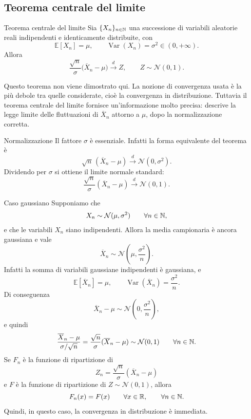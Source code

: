 \documentclass[a4paper]{article}
\begin{document}
\subsection{Teorema centrale del limite}

\begin{snippettheorem}{Teorema centrale del limite}
    Sia \(\{X_n\}_{n\in\mathbb{N}}\) una successione di variabili aleatorie reali indipendenti e identicamente distribuite, con
    \[
        \mathbb{E}[X_n]=\mu,
        \qquad
        \operatorname{Var}(X_n)=\sigma^2\in(0,+\infty).
    \]
    Allora
    \[
        \frac{\sqrt n}{\sigma}\bigl(\overline{X}_n-\mu\bigr)
        \xrightarrow{d}
        Z,
        \qquad
        Z\sim\mathcal{N}(0,1).
    \]
\end{snippettheorem}

Questo teorema non viene dimostrato qui. La nozione di convergenza usata è la più debole tra quelle considerate, cioè la convergenza in distribuzione. Tuttavia il teorema centrale del limite fornisce un'informazione molto precisa: descrive la legge limite delle fluttuazioni di \(\overline{X}_n\) attorno a \(\mu\), dopo la normalizzazione corretta.

\begin{snippetremark}{Normalizzazione}
    Il fattore \(\sigma\) è essenziale. Infatti la forma equivalente del teorema è
    \[
        \sqrt n\,(\overline{X}_n-\mu)
        \xrightarrow{d}
        \mathcal{N}(0,\sigma^2).
    \]
    Dividendo per \(\sigma\) si ottiene il limite normale standard:
    \[
        \frac{\sqrt n}{\sigma}(\overline{X}_n-\mu)
        \xrightarrow{d}
        \mathcal{N}(0,1).
    \]
\end{snippetremark}

\begin{snippetexample}{Caso gaussiano}
    Supponiamo che
    \[
        X_n\sim\mathcal{N}(\mu,\sigma^2)
        \qquad
        \forall n\in\mathbb{N},
    \]
    e che le variabili \(X_n\) siano indipendenti. Allora la media campionaria è ancora gaussiana e vale
    \[
        \overline{X}_n\sim\mathcal{N}\left(\mu,\frac{\sigma^2}{n}\right).
    \]
    Infatti la somma di variabili gaussiane indipendenti è gaussiana, e
    \[
        \mathbb{E}[\overline{X}_n]=\mu,
        \qquad
        \operatorname{Var}(\overline{X}_n)=\frac{\sigma^2}{n}.
    \]
    Di conseguenza
    \[
        \overline{X}_n-\mu
        \sim
        \mathcal{N}\left(0,\frac{\sigma^2}{n}\right),
    \]
    e quindi
    \[
        \frac{\overline{X}_n-\mu}{\sigma/\sqrt n}
        =
        \frac{\sqrt n}{\sigma}(\overline{X}_n-\mu)
        \sim
        \mathcal{N}(0,1)
        \qquad
        \forall n\in\mathbb{N}.
    \]
    Se \(F_n\) è la funzione di ripartizione di
    \[
        Z_n=
        \frac{\sqrt n}{\sigma}(\overline{X}_n-\mu)
    \]
    e \(F\) è la funzione di ripartizione di \(Z\sim\mathcal{N}(0,1)\), allora
    \[
        F_n(x)=F(x)
        \qquad
        \forall x\in\mathbb{R},
        \qquad
        \forall n\in\mathbb{N}.
    \]
    Quindi, in questo caso, la convergenza in distribuzione è immediata.
\end{snippetexample}
\end{document}
